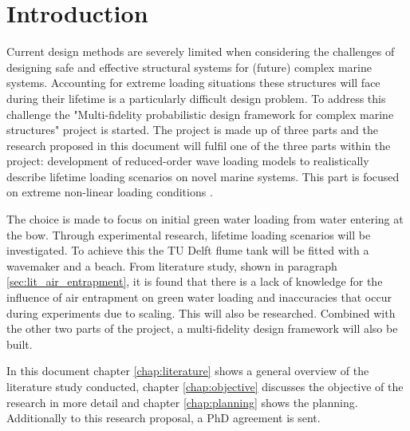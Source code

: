\chapter{Introduction}
\label{chap:introduction}
Current design methods are severely limited when considering the challenges of designing safe and effective structural systems for (future) complex marine systems. Accounting for extreme loading situations these structures will face during their lifetime is a particularly difficult design problem. To address this challenge the "Multi-fidelity probabilistic design framework for complex marine structures" project is started. The project is made up of three parts and the research proposed in this document will fulfil one of the three parts within the project: development of reduced-order wave loading models to realistically describe lifetime loading scenarios on novel marine systems. This part is focused on extreme non-linear loading conditions \cite{ResearchProposal2020}. 
\par 
The choice is made to focus on initial green water loading from water entering at the bow. Through experimental research, lifetime loading scenarios will be investigated. To achieve this the TU Delft flume tank will be fitted with a wavemaker and a beach. From literature study, shown in paragraph \ref{sec:lit_air_entrapment}, it is found that there is a lack of knowledge for the influence of air entrapment on green water loading and inaccuracies that occur during experiments due to scaling. This will also be researched. Combined with the other two parts of the project, a multi-fidelity design framework will also be built. 
\par 
In this document chapter \ref{chap:literature} shows a general overview of the literature study conducted, chapter \ref{chap:objective} discusses the objective of the research in more detail and chapter \ref{chap:planning} shows the planning. Additionally to this research proposal, a PhD agreement is sent.
\nopagebreak